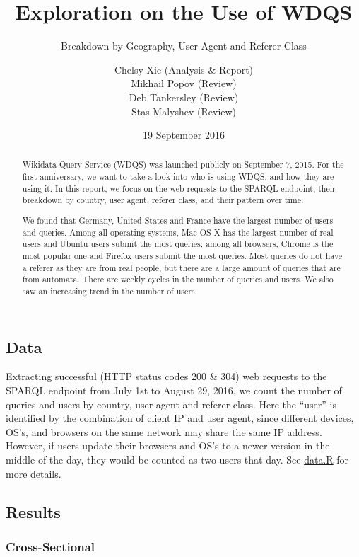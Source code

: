 \documentclass[12pt,]{article}
\title{Exploration on the Use of WDQS}
\subtitle{Breakdown by Geography, User Agent and Referer Class}
\author{Chelsy Xie (Analysis \& Report) \\ Mikhail Popov (Review) \\ Deb Tankersley (Review) \\ Stas Malyshev (Review)}
\date{19 September 2016}
\begin{document}
\maketitle

\renewcommand{\abstractname}{Executive Summary}

\begin{abstract}
Wikidata Query Service (WDQS) was launched publicly on September 7, 2015. For the first anniversary, we want to take a look into who is using WDQS, and how they are using it. In this report, we focus on the web requests to the SPARQL endpoint, their breakdown by country, user agent, referer class, and their pattern over time. 

We found that Germany, United States and France have the largest number of users and queries. Among all operating systems, Mac OS X has the largest number of real users and Ubuntu users submit the most queries; among all browsers, Chrome is the most popular one and Firefox users submit the most queries. Most queries do not have a referer as they are from real people, but there are a large amount of queries that are from automata. There are weekly cycles in the number of queries and users. We also saw an increasing trend in the number of users.
\end{abstract}

\subsection{Data}\label{data}

Extracting successful (HTTP status codes 200 \& 304) web requests to the
SPARQL endpoint from July 1st to August 29, 2016, we count the number of
queries and users by country, user agent and referer class. Here the
``user'' is identified by the combination of client IP and user agent,
since different devices, OS's, and browsers on the same network may
share the same IP address. However, if users update their browsers and
OS's to a newer version in the middle of the day, they would be counted
as two users that day. See
\href{https://github.com/wikimedia-research/Discovery-WDQS-Usage-Explore/blob/master/data.R}{data.R}
for more details.

\newpage

\subsection{Results}\label{results}

\subsubsection{Cross-Sectional}\label{cross-sectional}
\end{document}
